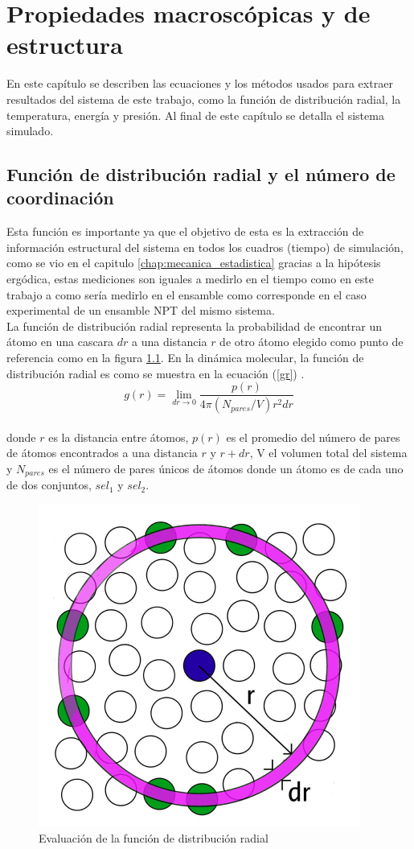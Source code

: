\chapter{Propiedades macroscópicas y de estructura}

En este capítulo se describen las ecuaciones y los métodos usados para extraer resultados del sistema de este trabajo, como la función de distribución radial, la temperatura, energía y presión. Al final de este capítulo se detalla el sistema simulado.

\section{Función de distribución radial y el número de coordinación}

Esta función es importante ya que el objetivo de esta es la extracción de información estructural del sistema en todos los cuadros (tiempo) de simulación, como se vio en el capitulo \ref{chap:mecanica_estadistica} gracias a la hipótesis ergódica, estas mediciones son iguales a medirlo en el tiempo como en este trabajo a como sería medirlo en el ensamble como corresponde en el caso experimental de un ensamble NPT del mismo sistema.\\

La función de distribución radial representa la probabilidad de encontrar un átomo en una cascara $dr$ a una distancia $r$ de otro átomo elegido como punto de referencia como en la figura \ref{fig:gr}. En la dinámica molecular, la función de distribución radial es como se muestra en la ecuación (\ref{gr}) \cite{LEVINE20113556}.\\

\begin{equation} \label{gr}
    g(r)=\lim_{dr\to 0} \frac{p(r)}{4\pi \left(N_{pares}/V\right)r^{2}dr}
\end{equation}\\

donde $r$ es la distancia entre átomos, $p(r)$ es el promedio del número de pares de átomos encontrados a una distancia $r$ y $r+dr$, V el volumen total del sistema y $N_{pares}$ es el número de pares únicos de átomos donde un átomo es de cada uno de dos conjuntos, $sel_1$ y $sel_2$.\\

\begin{figure}[!h]
    \centering
    \includegraphics[width=.2\textwidth,keepaspectratio=true]{gr.png}
    \caption{Evaluación de la función de distribución radial}
    \label{fig:gr}
\end{figure}

